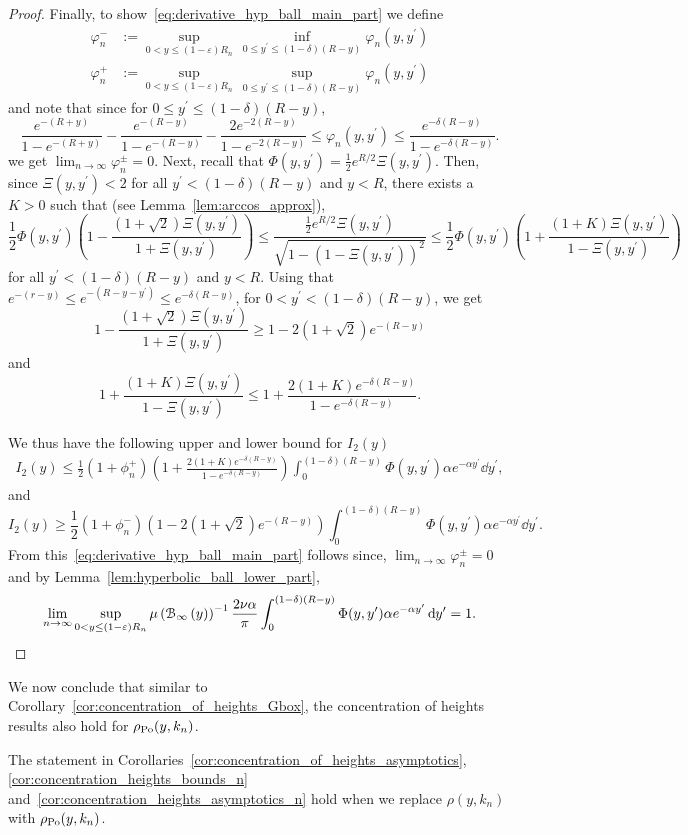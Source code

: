 \begin{proof}
Finally, to show~\eqref{eq:derivative_hyp_ball_main_part} we define 
\begin{align*}
	\varphi^-_n &:= \sup_{0 < y \le (1-\varepsilon)R_n} \, \inf_{0 \le y^\prime \le (1 - \delta)(R-y)} 
		\varphi_n(y,y^\prime)\\
	\varphi^+_n &:= \sup_{0 < y \le (1-\varepsilon)R_n} \, \sup_{0 \le y^\prime \le (1 - \delta)(R-y)} \varphi_n(y,y^\prime)
\end{align*}
and note that since for $0 \le y^\prime \le (1-\delta)(R-y)$,
\[
	\frac{e^{-(R + y)}}{1 - e^{-(R+y)}} - \frac{e^{-(R- y)}}{1 - e^{-(R-y)}} - \frac{2e^{-2(R-y)}}{1 - e^{-2(R-y)}}
	\le \varphi_n(y,y^\prime) \le \frac{e^{-\delta(R-y)}}{1 - e^{-\delta(R-y)}}.
\] 
we get $\lim_{n \to \infty} \varphi^\pm_n = 0$. Next, recall that $\Phi(y,y^\prime) = \frac{1}{2}e^{R/2}\Xi(y,y^\prime)$. Then, since $\Xi(y,y^\prime) < 2$ for all $y^\prime < (1-\delta)(R-y)$ and $y < R$, there exists a $K > 0$ such that (see Lemma~\ref{lem:arccos_approx}),
\[
	\frac{1}{2}\Phi(y,y^\prime)\left(1 - \frac{(1+\sqrt{2})\Xi(y,y^\prime)}{1 + \Xi(y,y^\prime)}\right)
	\le \frac{\frac{1}{2}e^{R/2} \Xi(y,y^\prime)}{\sqrt{1 - \left(1 - \Xi(y,y^\prime)\right)^2}} 
	\le \frac{1}{2}\Phi(y,y^\prime)\left(1 + \frac{(1+K)\Xi(y,y^\prime)}{1 - \Xi(y,y^\prime)}\right)
\]
for all $y^\prime < (1-\delta)(R - y)$ and $y < R$. Using that $e^{-(r-y)} \le e^{-(R - y - y^\prime)} \le e^{-\delta(R- y)}$, for $0 < y^\prime < (1-\delta)(R-y)$, we get
\[
	1 - \frac{(1+\sqrt{2})\Xi(y,y^\prime)}{1 + \Xi(y,y^\prime)} \ge 1 - 2(1+\sqrt{2})e^{-(R-y)}
\]
and
\[
	1 + \frac{(1+K)\Xi(y,y^\prime)}{1 - \Xi(y,y^\prime)} 
	\le 1 + \frac{2(1 + K)e^{-\delta(R - y)}}{1-e^{-\delta(R-y)}}.
\]

We thus have the following upper and lower bound for $I_2(y)$
\begin{align*}
	I_2(y) \le \frac{1}{2} \left(1 + \phi_n^+\right)
	\left(1 + \frac{2(1 + K)e^{-\delta(R - y)}}{1-e^{-\delta(R-y)}}\right)
	\int_{0}^{(1-\delta)(R-y)} \Phi(y,y^\prime) \alpha e^{-\alpha y^\prime} \dd y^\prime,
\end{align*}
and
\[
	I_2(y) \ge \frac{1}{2} \left(1 + \phi_n^-\right)\left(1 - 2(1+\sqrt{2})e^{-(R-y)}\right)
	\int_{0}^{(1-\delta)(R-y)} \Phi(y,y^\prime) \alpha e^{-\alpha y^\prime} \dd y^\prime.
\]
From this~\eqref{eq:derivative_hyp_ball_main_part} follows since, $\lim_{n \to \infty} \varphi_n^\pm = 0$ and by Lemma~\ref{lem:hyperbolic_ball_lower_part},
\[
	\lim_{n \to \infty} \sup_{0 < y \le (1-\varepsilon)R_n} \mu\left({\mathcal B}_{\infty}\left(y\right)\right)^{-1} \frac{2\nu \alpha}{\pi} 
	\int_{0}^{(1-\delta)(R-y)} \Phi(y,y^\prime) \alpha e^{-\alpha y^\prime} \operatorname{\mathrm{d}\hspace{-2pt}} y^\prime
	= 1.
\] 
\end{proof}

We now conclude that similar to Corollary~\ref{cor:concentration_of_heights_Gbox}, the concentration of heights results also hold for $\rho_{{\mathrm{Po}}}(y,k_n)$.

\begin{corollary}\label{cor:concentration_of_heights_GPo}
The statement in Corollaries~\ref{cor:concentration_of_heights_asymptotics}, \ref{cor:concentration_heights_bounds_n}
and~\ref{cor:concentration_heights_asymptotics_n} hold when we replace $\rho(y,k_n)$ with $\rho_{{\mathrm{Po}}}(y,k_n)$.
\end{corollary}

